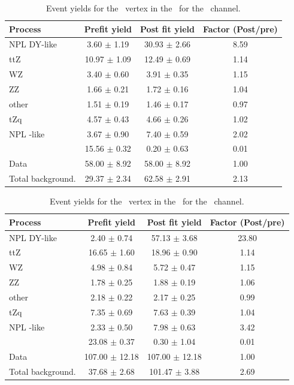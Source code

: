\begin{table}[htbp]
	\centering
	\caption{Event yields for the \Zct\ vertex in the \TTSR\  for the \emumu\ channel. }
	\begin{tabular} {l c c c }
		\toprule
		Process & Prefit yield & Post fit yield & Factor (Post/pre) \\
		\midrule
		NPL DY-like & 3.60 $ \pm $ 1.19 & 30.93 $ \pm $ 2.66 & 8.59 \\ 
		ttZ & 10.97 $ \pm $ 1.09 & 12.49 $ \pm $ 0.69 & 1.14 \\ 
		WZ & 3.40 $ \pm $ 0.60 & 3.91 $ \pm $ 0.35 & 1.15 \\ 
		ZZ & 1.66 $ \pm $ 0.21 & 1.72 $ \pm $ 0.16 & 1.04 \\ 
		other & 1.51 $ \pm $ 0.19 & 1.46 $ \pm $ 0.17 & 0.97 \\ 
		tZq & 4.57 $ \pm $ 0.43 & 4.66 $ \pm $ 0.26 & 1.02 \\ 
		NPL \ttbar-like & 3.67 $ \pm $ 0.90 & 7.40 $ \pm $ 0.59 & 2.02\\
		\kZct  & 15.56 $ \pm $ 0.32 & 0.20 $ \pm $ 0.63 & 0.01\\
		\hdashline
		Data & 58.00 $ \pm $ 8.92 & 58.00 $ \pm $ 8.92 & 1.00\\
		Total background. & 29.37 $ \pm $ 2.34 & 62.58 $ \pm $ 2.91 & 2.13\\
		\bottomrule
	\end{tabular}
\end{table}
\begin{table}[htbp]
	\centering
	\caption{Event yields for the \Zct\ vertex in the \TTSR\  for the \mumumu\ channel. }
	\begin{tabular} {l c c c }
		\toprule
		Process & Prefit yield & Post fit yield & Factor (Post/pre) \\
		\midrule
		NPL DY-like & 2.40 $ \pm $ 0.74 & 57.13 $ \pm $ 3.68 & 23.80 \\ 
		ttZ & 16.65 $ \pm $ 1.60 & 18.96 $ \pm $ 0.90 & 1.14 \\ 
		WZ & 4.98 $ \pm $ 0.84 & 5.72 $ \pm $ 0.47 & 1.15 \\ 
		ZZ & 1.78 $ \pm $ 0.25 & 1.88 $ \pm $ 0.19 & 1.06 \\ 
		other & 2.18 $ \pm $ 0.22 & 2.17 $ \pm $ 0.25 & 0.99 \\ 
		tZq & 7.35 $ \pm $ 0.69 & 7.63 $ \pm $ 0.39 & 1.04 \\ 
		NPL \ttbar-like & 2.33 $ \pm $ 0.50 & 7.98 $ \pm $ 0.63 & 3.42\\
		\kZct  & 23.08 $ \pm $ 0.37 & 0.30 $ \pm $ 1.04 & 0.01\\
		\hdashline
		Data & 107.00 $ \pm $ 12.18 & 107.00 $ \pm $ 12.18 & 1.00\\
		Total background. & 37.68 $ \pm $ 2.68 & 101.47 $ \pm $ 3.88 & 2.69\\
		\bottomrule
	\end{tabular}
\end{table}
